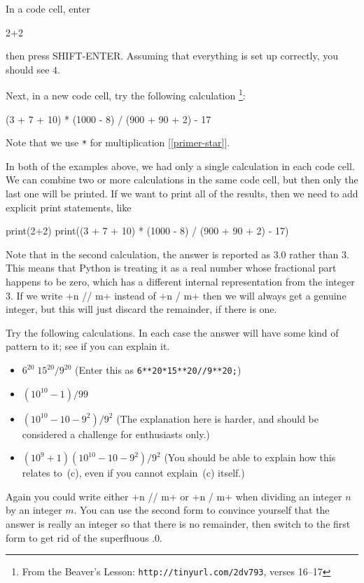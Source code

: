 \documentclass[a4paper,10pt]{amsbook}
\begin{document}
\begin{exercise}\label{ex-twoplustwo}
 In a code cell, enter
\begin{pcodeblock}
  2+2
\end{pcodeblock}
 then press SHIFT-ENTER.  Assuming that everything is set up
 correctly, you should see $4$.  

 Next, in a new code cell, try the following calculation%
 \footnote{From the Beaver's Lesson:
 \verb~http://tinyurl.com/2dv793~,
 verses 16--17}:
\begin{pcodeblock}
  (3 + 7 + 10) * (1000 - 8) / (900 + 90 + 2) - 17
\end{pcodeblock}
 Note that we use \verb~*~ for
 multiplication [\ref{primer-star}].  

 In both of the examples above, we had only a single calculation in
 each code cell.  We can combine two or more calculations in the same
 code cell, but then only the last one will be printed.  If we want to
 print all of the results, then we need to add explicit print
 statements, like
 \begin{pcodeblock}
  print(2+2)
  print((3 + 7 + 10) * (1000 - 8) / (900 + 90 + 2) - 17)
 \end{pcodeblock}

 Note that in the second calculation, the answer is reported as $3.0$
 rather than $3$.  This means that Python is treating it as a real
 number whose fractional part happens to be zero, which has a
 different internal representation from the integer $3$.  If we write
 \pcode+n // m+ instead of \pcode+n / m+ then we will always get a
 genuine integer, but this will just discard the remainder, if there
 is one.
\end{exercise}

\begin{exercise}\label{ex-numeric-misc}
 Try the following calculations.  In each case the answer will have
 some kind of pattern to it; see if you can explain it. 
 \begin{itemize}
  \item[(a)] $6^{20}\;15^{20}/9^{20}$ (Enter this as
   \verb~6**20*15**20//9**20;~) 
  \item[(b)] $(10^{10}-1)/99$
  \item[(c)] $(10^{10}-10-9^2)/9^2$ (The explanation here is
   harder, and should be considered a challenge for enthusiasts only.)  
  \item[(d)] $(10^9+1)(10^{10}-10-9^2)/9^2$ (You should be able to
   explain how this relates to~(c), even if you cannot explain~(c)
   itself.)  
 \end{itemize}
 Again you could write either \pcode+n // m+ or \pcode+n / m+ when
 dividing an integer $n$ by an integer $m$.  You can use the second
 form to convince yourself that the answer is really an integer so
 that there is no remainder, then switch to the first form to get rid
 of the superfluous $.0$.
\end{exercise}
\end{document}
